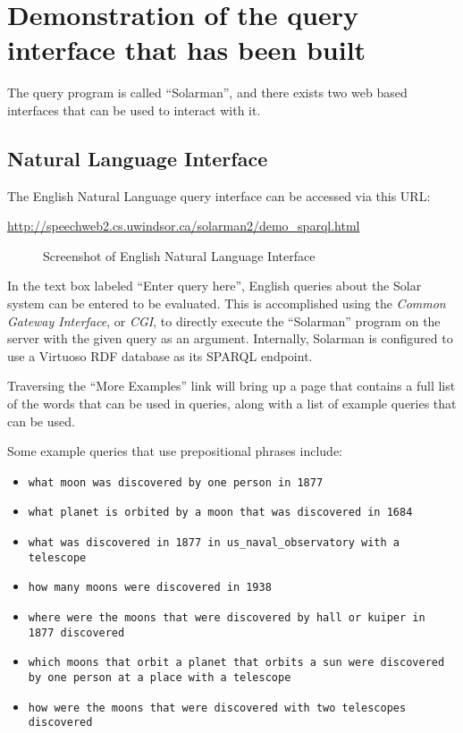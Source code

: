 \documentclass[../main.tex]{subfiles}
\begin{document}
\chapter{Demonstration of the query interface that has been built}
\label{chapter:demonstration}

The query program is called ``Solarman'', and there exists two web based interfaces that can be used to interact with it.

\section{Natural Language Interface}

The English Natural Language query interface can be accessed via this URL:

\url{http://speechweb2.cs.uwindsor.ca/solarman2/demo_sparql.html}


\begin{figure}[h]
\centering
{}
\caption{Screenshot of English Natural Language Interface}
\end{figure}
In the text box labeled ``Enter query here'', English queries about the Solar system can be entered to be evaluated.  This is accomplished using the {\em Common Gateway Interface}, or {\em CGI}, to directly execute the ``Solarman'' program on the server with the given query as an argument.  Internally, Solarman is configured to use a Virtuoso\cite{virtuoso} RDF database as its SPARQL endpoint.

Traversing the ``More Examples'' link will bring up a page that contains a full list of the words that can be used in queries, along with a list of example queries that can be used.

Some example queries that use prepositional phrases include:

\begin{itemize}
	\item \texttt{what moon was discovered by one person in 1877}
	\item \texttt{what planet is orbited by a moon that was discovered in 1684}
	\item \texttt{what was discovered in 1877 in us\_naval\_observatory with a \\ telescope}
	\item \texttt{how many moons were discovered in 1938}
	\item \texttt{where were the moons that were discovered by hall or kuiper in \\ 1877 discovered}
	\item \texttt{which moons that orbit a planet that orbits a sun were discovered \\ by one person at a place with a telescope}
	\item \texttt{how were the moons that were discovered with two telescopes\\ discovered}
\end{itemize}
\end{document}
